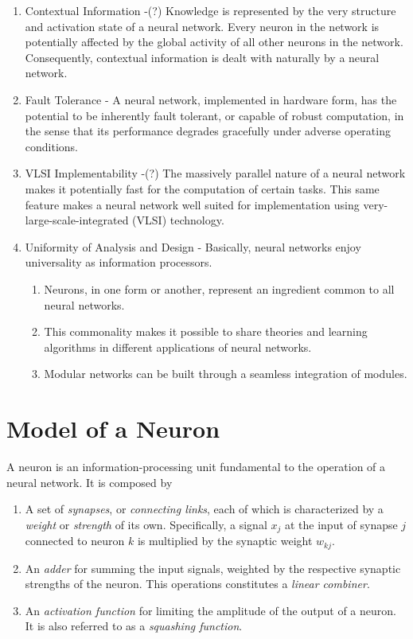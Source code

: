 \documentclass[twocolumn]{article}
\begin{document}
\begin{enumerate}
		 \item Contextual Information -(?) Knowledge is represented by the very structure and activation state of a neural network. Every neuron in the network is potentially affected by the global activity of all other neurons in the network. Consequently, contextual information is dealt with naturally by a neural network.
		 \item Fault Tolerance - A neural network, implemented in hardware form, has the potential to be inherently fault tolerant, or capable of robust computation, in the sense that its performance degrades gracefully under adverse operating conditions.
		 \item VLSI Implementability -(?) The massively parallel nature of a neural network makes it potentially fast for the computation of certain tasks. This same feature makes a neural network well suited for implementation using very-large-scale-integrated (VLSI) technology.
		 \item Uniformity of Analysis and Design - Basically, neural networks enjoy universality as information processors.
		       \begin{enumerate}
			       \item Neurons, in one form or another, represent an ingredient common to all neural networks.
			       \item This commonality makes it possible to share theories and learning algorithms in different applications of neural networks.
			       \item Modular networks can be built through a seamless integration of modules.
		       \end{enumerate}
	 \end{enumerate}

\section{Model of a Neuron}

 A neuron is an information-processing unit fundamental to the operation of a neural network. It is composed by

 \begin{enumerate}
	 \item A set of \textit{synapses}, or \textit{connecting links}, each of which is characterized by a \textit{weight} or \textit{strength} of its own. Specifically, a signal $ x_j $ at the input of synapse $ j $ connected to neuron $ k $ is multiplied by the synaptic weight $ w_{kj} $.
	 \item An \textit{adder} for summing the input signals, weighted by the respective synaptic strengths of the neuron. This operations constitutes a \textit{linear combiner}.
	 \item An \textit{activation function} for limiting the amplitude of the output of a neuron. It is also referred to as a \textit{squashing function}.
 \end{enumerate}
\end{document}

